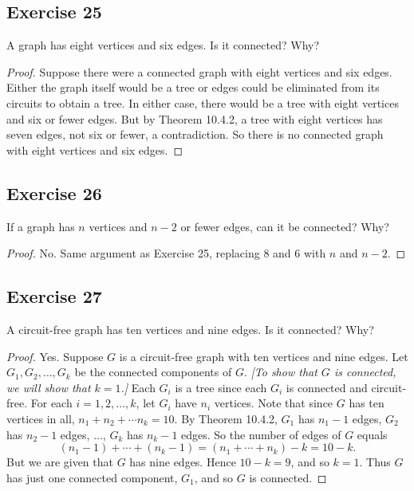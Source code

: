 \documentclass[14pt]{extarticle}
\begin{document}
\subsection{Exercise 25}
A graph has eight vertices and six edges. Is it connected? Why?

\begin{proof}
    Suppose there were a connected graph with eight vertices and six edges. Either the graph itself would be a tree or edges
    could be eliminated from its circuits to obtain a tree. In either case, there would be a tree with eight vertices and six
    or fewer edges. But by Theorem 10.4.2, a tree with eight vertices has seven edges, not six or fewer, a contradiction.
    So there is no connected graph with eight vertices and six edges.
\end{proof}

\subsection{Exercise 26}
If a graph has \(n\) vertices and \(n - 2\) or fewer edges, can it be connected? Why?

\begin{proof}
    No. Same argument as Exercise 25, replacing 8 and 6 with \(n\) and \(n-2\).
\end{proof}

\subsection{Exercise 27}
A circuit-free graph has ten vertices and nine edges. Is it connected? Why?

\begin{proof}
    Yes. Suppose \(G\) is a circuit-free graph with ten vertices and nine edges. Let \(G_1, G_2, \ldots, G_k\) be the connected
    components of \(G\). {\it [To show that \(G\) is connected, we will show that \(k = 1\).]} Each \(G_i\) is a tree since each
    \(G_i\) is connected and circuit-free. For each \(i = 1, 2, \ldots, k\), let \(G_i\) have \(n_i\) vertices. Note that
    since \(G\) has ten vertices in all, \(n_1 + n_2 + \cdots n_k = 10\). By Theorem 10.4.2, \(G_1\) has \(n_1 - 1\) edges,
    \(G_2\) has \(n_2 - 1\) edges, \(\ldots\), \(G_k\) has \(n_k - 1\) edges. So the number of edges of \(G\) equals
    \[
        (n_1 - 1) + \cdots + (n_k - 1) = (n_1 + \cdots + n_k) - k = 10-k.
    \]
    But we are given that \(G\) has nine edges. Hence \(10 - k = 9\), and so \(k = 1\). Thus \(G\) has just one connected
    component, \(G_1\), and so \(G\) is connected.
\end{proof}
\end{document}
